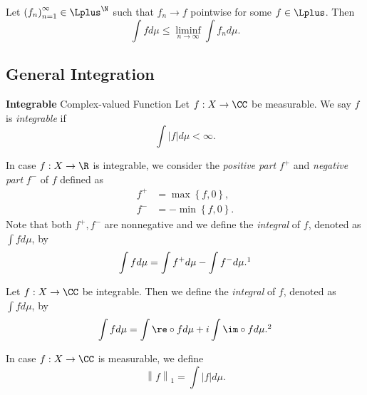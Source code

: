 \documentclass[pmath451]{subfiles}
\begin{document}
    \begin{cor}{}
        Let $\left( f_{n} \right)^{\infty}_{n=1}\in\Lplus^{\N}$ such that $f_n\to f$ pointwise for some $f\in\Lplus$. Then
        \begin{equation*}
            \int fd\mu \leq \liminf_{n\to\infty}\int f_nd\mu.
        \end{equation*}
    \end{cor}	
    
    \rruleline

    \subsection{General Integration}
    
    \begin{definition}{\textbf{Integrable} Complex-valued Function}
        Let $f:X\to\CC$ be measurable. We say $f$ is \emph{integrable} if
        \begin{equation*}
            \int\left| f \right|d\mu < \infty.
        \end{equation*}
        
        In case $f:X\to\R$ is integrable, we consider the \emph{positive part} $f^+$ and \emph{negative part} $f^-$ of $f$ defined as
        \begin{equation*}
            \begin{aligned}
                f^+ & = \max\left\lbrace f,0 \right\rbrace, \\
                f^- & = -\min\left\lbrace f,0 \right\rbrace.
            \end{aligned} 
        \end{equation*}
        Note that both $f^+,f^-$ are nonnegative and we define the \emph{integral} of $f$, denoted as $\int fd\mu$, by
        \begin{equation*}
            \int fd\mu = \int f^+d\mu - \int f^-d\mu.\footnotemark[1]
        \end{equation*}

        Let $f:X\to\CC$ be integrable. Then we define the \emph{integral} of $f$, denoted as $\int fd\mu$, by
        \begin{equation*}
            \int fd\mu = \int\re\circ fd\mu + i\int\im\circ fd\mu.\footnotemark[2]
        \end{equation*}

        In case $f:X\to\CC$ is measurable, we define
        \begin{equation*}
            \left\lVert f \right\rVert_{1} = \int\left| f \right|d\mu.
        \end{equation*}
        
        \noindent
        \begin{minipage}{\textwidth}
        \end{minipage}
    \end{definition}
    
\end{document}
